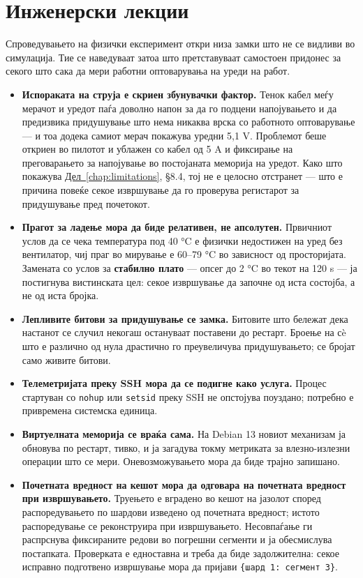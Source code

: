 \section{Инженерски лекции}

Спроведувањето на физички експеримент откри низа замки што не се видливи во симулација.
Тие се наведуваат затоа што претставуваат самостоен придонес за секого што сака да мери
работни оптоварувања на уреди на работ.

\begin{itemize}
  \item \textbf{Испораката на струја е скриен збунувачки фактор.} Тенок кабел меѓу мерачот и уредот паѓа доволно напон за да го подцени напојувањето и да предизвика придушување што нема никаква врска со работното оптоварување --- и тоа додека самиот мерач покажува уредни 5,1 V. Проблемот беше откриен во пилотот и ублажен со кабел од 5 A и фиксирање на преговарањето за напојување во постојаната меморија на уредот. Како што покажува \hyperref[chap:limitations]{Дел~\ref*{chap:limitations}}, §8.4, тој не е целосно отстранет --- што е причина повеќе секое извршување да го проверува регистарот за придушување пред почетокот.
  \item \textbf{Прагот за ладење мора да биде релативен, не апсолутен.} Првичниот услов да се чека температура под 40 °C е физички недостижен на уред без вентилатор, чиј праг во мирување е 60–79 °C во зависност од просторијата. Замената со услов за \textbf{стабилно плато} --- опсег до 2 °C во текот на 120 s --- ја постигнува вистинската цел: секое извршување да започне од иста состојба, а не од иста бројка.
  \item \textbf{Лепливите битови за придушување се замка.} Битовите што бележат дека настанот се случил некогаш остануваат поставени до рестарт. Броење на сè што е различно од нула драстично го преувеличува придушувањето; се бројат само живите битови.
  \item \textbf{Телеметријата преку SSH мора да се подигне како услуга.} Процес стартуван со \texttt{nohup} или \texttt{setsid} преку SSH не опстојува поуздано; потребно е привремена системска единица.
  \item \textbf{Виртуелната меморија се враќа сама.} На Debian 13 новиот механизам ја обновува по рестарт, тивко, и ја загадува токму метриката за влезно-излезни операции што се мери. Оневозможувањето мора да биде трајно запишано.
  \item \textbf{Почетната вредност на кешот мора да одговара на почетната вредност при извршувањето.} Труењето е вградено во кешот на јазолот според распоредувањето по шардови изведено од почетната вредност; истото распоредување се реконструира при извршувањето. Несовпаѓање ги распрснува фиксираните редови во погрешни сегменти и ја обесмислува постапката. Проверката е едноставна и треба да биде задолжителна: секое исправно подготвено извршување мора да пријави \texttt{\{шард 1: сегмент 3\}}.
\end{itemize}

